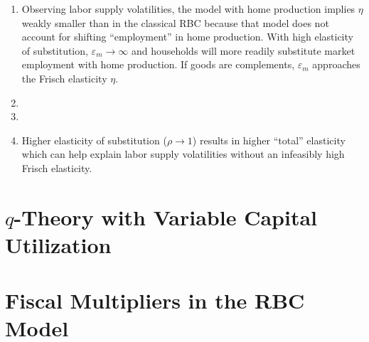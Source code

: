 \documentclass[11pt]{article}
\begin{document}
\begin{enumerate}
        \item Observing labor supply volatilities, the model with home production implies $\eta$ weakly smaller than in the classical RBC because that model does not account for shifting ``employment'' in home production. With high elasticity of substitution, $\varepsilon_m \to \infty$ and households will more readily substitute market employment with home production. If goods are complements, $\varepsilon_m$ approaches the Frisch elasticity $\eta$.

        \item

        \item

        \item Higher elasticity of substitution ($\rho \to 1$) results in higher ``total'' elasticity which can help explain labor supply volatilities without an infeasibly high Frisch elasticity.

    \end{enumerate}

\section{$q$-Theory with Variable Capital Utilization}

\section{Fiscal Multipliers in the RBC Model}
\end{document}
